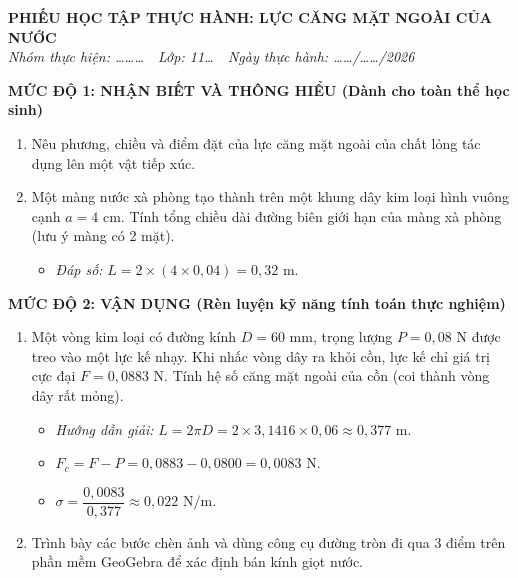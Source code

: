 \documentclass[12pt, a4paper]{article}
\begin{document}
\begin{center}
    \textbf{PHIẾU HỌC TẬP THỰC HÀNH: LỰC CĂNG MẶT NGOÀI CỦA NƯỚC}\\
    \textit{Nhóm thực hiện: \dots\dots\dots \ \textbar \ Lớp: 11\dots \ \textbar \ Ngày thực hành: \dots\dots/\dots\dots/2026}
\end{center}

\noindent \textbf{MỨC ĐỘ 1: NHẬN BIẾT VÀ THÔNG HIỂU (Dành cho toàn thể học sinh)}
\begin{enumerate}
    \item Nêu phương, chiều và điểm đặt của lực căng mặt ngoài của chất lỏng tác dụng lên một vật tiếp xúc.
    \item Một màng nước xà phòng tạo thành trên một khung dây kim loại hình vuông cạnh $a = 4\text{ cm}$. Tính tổng chiều dài đường biên giới hạn của màng xà phòng (lưu ý màng có 2 mặt).
    \begin{itemize}
        \item \textit{Đáp số:} $L = 2 \times (4 \times 0{,}04) = 0{,}32\text{ m}$.
    \end{itemize}
\end{enumerate}

\noindent \textbf{MỨC ĐỘ 2: VẬN DỤNG (Rèn luyện kỹ năng tính toán thực nghiệm)}
\begin{enumerate}
    \item Một vòng kim loại có đường kính $D = 60\text{ mm}$, trọng lượng $P = 0{,}08\text{ N}$ được treo vào một lực kế nhạy. Khi nhấc vòng dây ra khỏi cồn, lực kế chỉ giá trị cực đại $F = 0{,}0883\text{ N}$. Tính hệ số căng mặt ngoài của cồn (coi thành vòng dây rất mỏng).
    \begin{itemize}
        \item \textit{Hướng dẫn giải:} $L = 2\pi D = 2 \times 3{,}1416 \times 0{,}06 \approx 0{,}377\text{ m}$.
        \item $F_c = F - P = 0{,}0883 - 0{,}0800 = 0{,}0083\text{ N}$.
        \item $\sigma = \dfrac{0{,}0083}{0{,}377} \approx 0{,}022\text{ N/m}$.
    \end{itemize}
    \item Trình bày các bước chèn ảnh và dùng công cụ đường tròn đi qua 3 điểm trên phần mềm GeoGebra để xác định bán kính giọt nước.
\end{enumerate}
\end{document}
